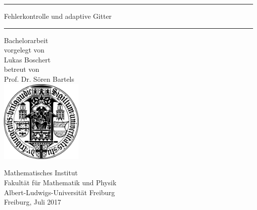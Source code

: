 \thispagestyle{empty}
\mbox{}
\begin{center}
\vspace*{2cm}
\hrule \vspace*{4mm}
{\huge \textsf{Fehlerkontrolle und adaptive Gitter}} \\[3mm]
\hrule \vspace*{3cm}
{\sc \huge Bachelorarbeit} \\[1cm]
vorgelegt von \\[.5cm]
{\Large Lukas Boschert} \\[1cm]
betreut von \\[.5cm]
{\Large Prof. Dr. S\"oren Bartels} \\[1.5cm]
\includegraphics[width=4cm]{pics/alu-wappen.png}

\bigskip

{\sc Mathematisches Institut} \\
{\sc Fakult\"at f\"ur Mathematik und Physik} \\
{\sc Albert-Ludwigs-Universit\"at Freiburg} \\[1cm]
{\Large Freiburg, Juli 2017}

\end{center}
\mbox{}

\newpage
\thispagestyle{empty}
\mbox{}

